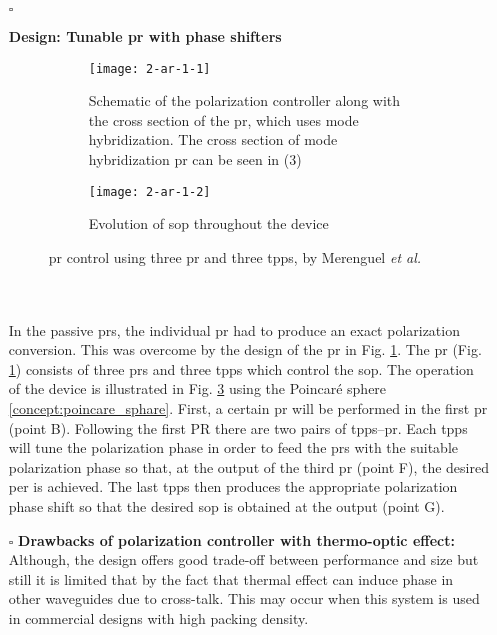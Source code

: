 \documentclass[../report.tex]{subfiles}
\begin{document}
	\begin{itemize}[leftmargin=*]
		
		\item[$\square$]\begin{minipage}[t]{\textwidth}\textbf{Design: Tunable \gls{pr} with phase shifters}
		\begin{figure}[H] %
			\begin{subfigure}[t]{0.45\textwidth}
				\texttt{[image: 2-ar-1-1]}
				\caption{Schematic of the polarization controller along with the cross section of the \gls{pr}, which uses mode hybridization. The cross section of mode hybridization \gls{pr} can be seen in (3)}
				\label{fig:2_ar_1_1}
			\end{subfigure}
			\hfill
			\begin{subfigure}[t]{0.45\textwidth}
				\texttt{[image: 2-ar-1-2]}
				\caption{Evolution of \gls{sop} throughout the device}
				\label{fig:2_ar_1_2}
			\end{subfigure}
			\caption{\gls{pr} control using three \gls{pr} and three \gls{tpps}, by Merenguel \textit{et al.} \cite{sarmiento-merenguel_demonstration_2015}}
		\end{figure}
		\end{minipage}\\\\
		\noindent In the passive \gls{pr}s, the individual \gls{pr} had to produce an exact polarization conversion. This was overcome by the design of the \gls{pr} in Fig. \ref{fig:2_ar_1_1}. The \gls{pr} (Fig. \ref{fig:2_ar_1_1}) consists of three \gls{pr}s and three \gls{tpps} which control the \gls{sop}. The operation of the device is illustrated in Fig. \ref{fig:2_ar_1_2} using the Poincaré sphere \ref{concept:poincare_sphare}. First, a certain \gls{pr} will be performed in the first \gls{pr} (point B). Following the first PR there are two pairs of \gls{tpps}–\gls{pr}. Each \gls{tpps} will tune the polarization phase in order to feed the \gls{pr}s with the suitable polarization phase so that, at the output of the third \gls{pr} (point F), the desired \gls{per} is achieved. The last \gls{tpps} then produces the appropriate polarization phase shift so that the desired \gls{sop} is obtained at the output (point G).
		
		\item[$\square$] \textbf{Drawbacks of polarization controller with thermo-optic effect:}
		Although, the design offers good trade-off between performance and size but still it is limited that by the fact that thermal effect can induce phase in other waveguides due to cross-talk. This may occur when this system is used in commercial designs with high packing density.
		

\end{itemize}
\end{document}
